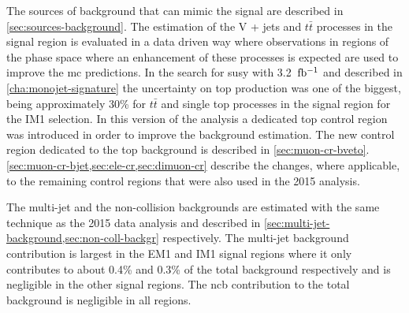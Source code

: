 The sources of background that can mimic the signal are described in
\cref{sec:sources-background}. The estimation of the V + jets and $t \bar{t}$
processes in the signal region is evaluated in a data driven way where
observations in regions of the phase space where an enhancement of these
processes is expected are used to improve the \gls{mc} predictions. In the
search for \gls{susy} with 3.2~$\mbox{fb$^{-1}$}$ and described in
\cref{cha:monojet-signature} the uncertainty on top production was one of the
biggest, being approximately 30\% for $t \bar{t}$ and single top processes in
the signal region for the IM1 selection. In this version of the analysis a
dedicated top control region was introduced in order to improve the background
estimation. The new control region dedicated to the top background is described
in \cref{sec:muon-cr-bveto}. \cref{sec:muon-cr-bjet,sec:ele-cr,sec:dimuon-cr}
describe the changes, where applicable, to the remaining control regions that
were also used in the 2015 analysis.

The multi-jet and the non-collision backgrounds are estimated with the same
technique as the 2015 data analysis and described in
\cref{sec:multi-jet-background,sec:non-coll-backgr} respectively. The multi-jet
background contribution is largest in the EM1 and IM1 signal regions where it
only contributes to about 0.4\% and 0.3\% of the total background respectively
and is negligible in the other signal regions. The \gls{ncb} contribution to the
total background is negligible in all regions.

